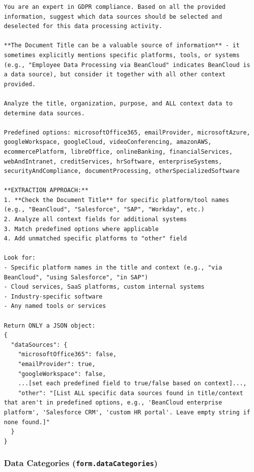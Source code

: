 \begin{lstlisting}
You are an expert in GDPR compliance. Based on all the provided information, suggest which data sources should be selected and deselected for this data processing activity.

**The Document Title can be a valuable source of information** - it sometimes explicitly mentions specific platforms, tools, or systems (e.g., "Employee Data Processing via BeanCloud" indicates BeanCloud is a data source), but consider it together with all other context provided.

Analyze the title, organization, purpose, and ALL context data to determine data sources.

Predefined options: microsoftOffice365, emailProvider, microsoftAzure, googleWorkspace, googleCloud, videoConferencing, amazonAWS, ecommercePlatform, libreOffice, onlineBanking, financialServices, webAndIntranet, creditServices, hrSoftware, enterpriseSystems, securityAndCompliance, documentProcessing, otherSpecializedSoftware

**EXTRACTION APPROACH:**
1. **Check the Document Title** for specific platform/tool names (e.g., "BeanCloud", "Salesforce", "SAP", "Workday", etc.)
2. Analyze all context fields for additional systems
3. Match predefined options where applicable
4. Add unmatched specific platforms to "other" field

Look for:
- Specific platform names in the title and context (e.g., "via BeanCloud", "using Salesforce", "in SAP")
- Cloud services, SaaS platforms, custom internal systems
- Industry-specific software
- Any named tools or services

Return ONLY a JSON object:
{
  "dataSources": {
    "microsoftOffice365": false,
    "emailProvider": true,
    "googleWorkspace": false,
    ...[set each predefined field to true/false based on context]...,
    "other": "[List ALL specific data sources found in title/context that aren't in predefined options, e.g., 'BeanCloud enterprise platform', 'Salesforce CRM', 'custom HR portal'. Leave empty string if none found.]"
  }
}
\end{lstlisting}

\subsubsection*{Data Categories (\texttt{form.dataCategories})}

